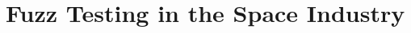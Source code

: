 \documentclass[../report.tex]{subfiles}
\begin{document}
\section{Fuzz Testing in the Space Industry}



\end{document}
